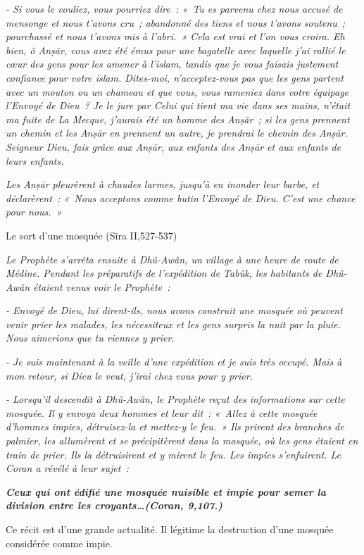 \emph{- Si vous le vouliez, vous pourriez dire~: «~Tu es parvenu chez
nous accusé de mensonge et nous t'avons cru~; abandonné des tiens et
nous t'avons soutenu~; pourchassé et nous t'avons mis à l'abri.~» Cela
est vrai et l'on vous croira. Eh bien, ô Anṣār, vous avez été émus pour
une bagatelle avec laquelle j'ai rallié le cœur des gens pour les amener
à l'islam, tandis que je vous faisais justement confiance pour votre
islam. Dites-moi, n'acceptez-vous pas que les gens partent avec un
mouton ou un chameau et que vous, vous rameniez dans votre équipage
l'Envoyé de Dieu~? Je le jure par Celui qui tient ma vie dans ses mains,
n'était ma fuite de La Mecque, j'aurais été un homme des Anṣār~; si les
gens prennent un chemin et les Anṣār en prennent un autre, je prendrai
le chemin des Anṣār. Seigneur Dieu, fais grâce aux Anṣār, aux enfants
des Anṣār et aux enfants de leurs enfants.}

\emph{Les Anṣār pleurèrent à chaudes larmes, jusqu'à en inonder leur
barbe, et déclarèrent~: «~Nous acceptons comme butin l'Envoyé de Dieu.
C'est une chance pour nous.~»}

Le sort d'une mosquée (Sīra II,527-537)

\emph{Le Prophète s'arrêta ensuite à Dhû-Awân, un village à une heure de
route de Médine. Pendant les préparatifs de l'expédition de Tabûk, les
habitants de Dhû-Awân étaient venus voir le Prophète~:}

\emph{- Envoyé de Dieu, lui dirent-ils, nous avons construit une mosquée
où peuvent venir prier les malades, les nécessiteux et les gens surpris
la nuit par la pluie. Nous aimerions que tu viennes y prier.}

\emph{- Je suis maintenant à la veille d'une expédition et je suis très
occupé. Mais à mon retour, si Dieu le veut, j'irai chez vous pour y
prier.}

\emph{- Lorsqu'il descendit à Dhû-Awân, le Prophète reçut des
informations sur cette mosquée. Il y envoya deux hommes et leur dit~:
«~Allez à cette mosquée d'hommes impies, détruisez-la et mettez-y le
feu.~» Ils prirent des branches de palmier, les allumèrent et se
précipitèrent dans la mosquée, où les gens étaient en train de prier.
Ils la détruisirent et y mirent le feu. Les impies s'enfuirent. Le Coran
a révélé à leur sujet~:}

\emph{\textbf{Ceux qui ont édifié une mosquée nuisible et impie pour
semer la division entre les croyants\ldots(Coran, 9,107.)}}

Ce récit est d'une grande actualité. Il légitime la destruction d'une
mosquée considérée comme impie.

